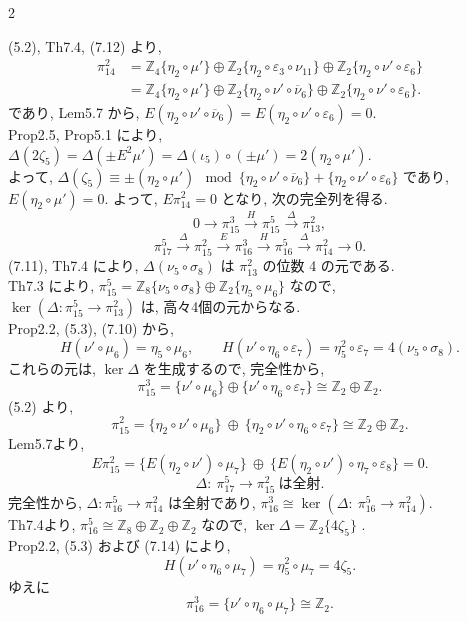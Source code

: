 \documentclass[10pt, leqno]{ltjsarticle}
\newcommand{\ov}[1]{\overline{#1}}
\newcommand{\gen}[1]{\{#1\}}       %
\newcommand{\pit}[2]{\pi_{#1}^{#2}}
\numberwithin{equation}{section}
\theoremstyle{plain}
\theoremstyle{definition}
\theoremstyle{remark}
\begin{document}
\begin{paracol}{2}

(5.2),  Th7.4, (7.12) より, 
\[
\begin{align*}
\pit{14}{2}
& = \mathbb{Z}_4\gen{\eta_2\circ\mu'}
\oplus \mathbb{Z}_2\gen{\eta_2\circ\varepsilon_{3}\circ\nu_{11}}
\oplus \mathbb{Z}_2\gen{\eta_2\circ\nu'\circ\varepsilon_6} \\
& = \mathbb{Z}_4\gen{\eta_2\circ\mu'}
\oplus \mathbb{Z}_2\gen{\eta_2\circ\nu'\circ\ov{\nu}_{6}}
\oplus \mathbb{Z}_2\gen{\eta_2\circ\nu'\circ\varepsilon_6}.
\end{align*}
\]
であり,  Lem5.7 から,
\(E(\eta_2\circ\nu'\circ\ov{\nu}_6) 
= E(\eta_{2}\circ\nu'\circ\varepsilon_6) = 0.\)\\
Prop2.5, Prop5.1 により, 
\(
\Delta(2\zeta_5)
= \Delta(\pm E^2\mu')
= \Delta(\iota_5)\circ(\pm\mu')
= 2(\eta_2\circ\mu') .
\)\\
よって,
\(
\Delta(\zeta_5)\equiv \pm(\eta_2\circ\mu')
\mod \gen{\eta_2\circ\nu'\circ\overline{\nu}_6} 
+ \gen{\eta_2\circ\nu'\circ\varepsilon_6}
\)
であり, \\
\(E(\eta_2\circ\mu') = 0 .\) 
よって, \(E\pit{14}{2} = 0\) となり, 
次の完全列を得る.
\[
0\to \pit{15}{3}\xrightarrow{H}\pit{15}{5}\xrightarrow{\Delta}\pit{13}{2},
\]
\[
\pit{17}{5}\xrightarrow{\Delta}\pit{15}{2}
\xrightarrow{E}\pit{16}{3}
\xrightarrow{H}\pit{16}{5}
\xrightarrow{\Delta}\pit{14}{2}
\to 0 .
\]
(7.11), Th7.4 により, 
\(\Delta(\nu_5\circ\sigma_8)\) は
\(\pit{13}{2}\) の位数 4 の元である. \\
Th7.3 により, 
\(\pit{15}{5} = \mathbb{Z}_8\gen{\nu_5\circ\sigma_8}
\oplus\mathbb{Z}_2\gen{\eta_5\circ\mu_6}\) 
なので,\\
\(\ker(\Delta:\pit{15}{5}\to\pit{13}{2})\) 
は, 高々4個の元からなる.\\
Prop2.2, (5.3), (7.10) から, 
\[
H(\nu'\circ\mu_6) = \eta_5\circ\mu_6,\qquad
H(\nu'\circ\eta_6\circ\varepsilon_7)
= \eta_5^2\circ\varepsilon_7
= 4(\nu_5\circ\sigma_8).
\]
これらの元は, 
\(\ker\Delta\)
を生成するので, 完全性から, 
\[
\pit{15}{3}
 = \gen{\nu'\circ\mu_6}\oplus\gen{\nu'\circ\eta_6\circ\varepsilon_7}
 \cong \mathbb{Z}_2\oplus\mathbb{Z}_2.
\]
(5.2) より,
\[
\pit{15}{2}
 = \gen{\eta_2\circ\nu'\circ\mu_6}\ \oplus\
   \gen{\eta_2\circ\nu'\circ\eta_6\circ\varepsilon_7}
 \cong \mathbb{Z}_2\oplus\mathbb{Z}_2 .
\]
Lem5.7より,
\[
E\pi_{15}^2
 = \gen{E(\eta_2\circ\nu')\circ\mu_7}\ \oplus\
   \gen{E(\eta_2\circ\nu')\circ\eta_7\circ\varepsilon_8}
 = 0 .
\]
\begin{equation}\label{eq:723}
\Delta:\ \pit{17}{5}\longrightarrow\pit{15}{2}\ \text{は全射} .
\end{equation}
完全性から,
\(\Delta:\pit{16}{5}\to\pit{14}{2}\) は全射であり,
\(\pit{16}{3} \cong \ker(\Delta:\ \pit{16}{5}\to\pit{14}{2})\).\\
Th7.4より, \(\pit{16}{5}\cong\mathbb{Z}_8\oplus\mathbb{Z}_2\oplus\mathbb{Z}_2\) 
なので, 
\(\ker\Delta = \mathbb{Z}_2 \gen{4 \zeta_5}\) .\\ 
 Prop2.2, (5.3) および (7.14) により,
\[
H(\nu'\circ\eta_6\circ\mu_7)=\eta_5^{2}\circ\mu_7=4\zeta_5 .
\]
ゆえに
\[
\pi_{16}^3=\gen{\nu'\circ\eta_6\circ\mu_7}\cong\mathbb{Z}_2 .
\]


\end{paracol}
\end{document}
